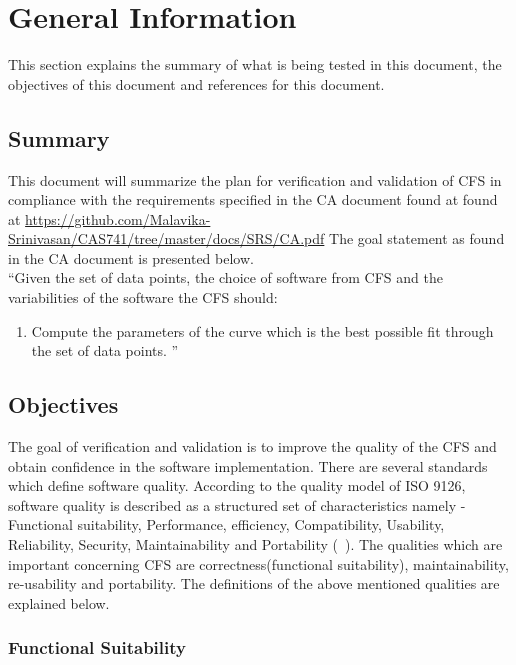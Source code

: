 \documentclass[12pt, titlepage]{article}
\newcommand{\famname}{CFS} %
\begin{document}
\section{General Information}

This section explains the summary of what is being tested in this document, the objectives of this document and references for this document. 


\subsection{Summary}

This document will summarize the plan for verification and validation of \famname{} in compliance with the requirements specified in the CA document found at found at \url{https://github.com/Malavika-Srinivasan/CAS741/tree/master/docs/SRS/CA.pdf} 
The goal statement as found in the CA document is presented below.\\
\noindent ``Given the set of data points, the choice of software from \famname{} and the variabilities of the software the \famname{} should:

\begin{enumerate}
	
	\item Compute the parameters of the curve which is the best possible fit through the set of data points.	''
\end{enumerate}


\subsection{Objectives}

The goal of verification and validation is to improve the quality of the \famname{} and obtain confidence in the software implementation. There are several standards which define software quality. According to the quality model of ISO 9126,  software quality is described as a structured set of characteristics namely - Functional suitability, Performance, efficiency, Compatibility, Usability,  Reliability, Security, Maintainability and Portability (~\cite{ISO9126}). The qualities which are important concerning \famname{} are correctness(functional suitability), maintainability, re-usability and portability. The definitions of the above mentioned qualities are explained below.

\subsubsection {Functional Suitability}
\end{document}
